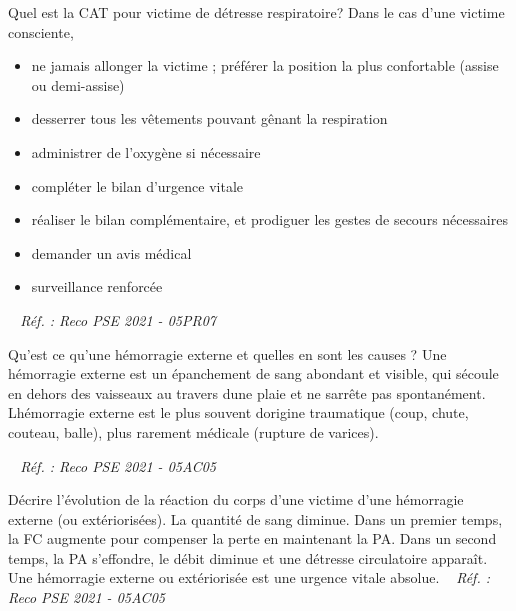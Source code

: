 \documentclass[grid,avery5371,landscape]{flashcards}
\makeatletter
\newcounter{nocarte}
\newcommand{\categ}[1]{%
  \def\@categ{#1}%
  \setcounter{nocarte}{0}%
}
\newcommand{\source}[1]{%
  \medskip
  \itshape%
   ~ \hfill Réf. : #1}
\makeatother
\begin{document}
\color[HTML]{003273}
\categ{PSE}
\begin{flashcard}[CAT]{
 Quel est la CAT pour victime de détresse respiratoire?   }
  Dans le cas d'une victime consciente, \begin{itemize} 
\item ne jamais allonger la victime ; préférer la position la plus confortable (assise ou demi-assise)
\item desserrer tous les vêtements pouvant gênant la respiration
\item administrer de l'oxygène si nécessaire 
\item compléter le bilan d'urgence vitale 
\item réaliser le bilan complémentaire, et prodiguer les gestes de secours nécessaires 
\item demander un avis médical 
\item surveillance renforcée \end{itemize}
  \source{Reco PSE 2021 - 05PR07}
\end{flashcard}


\color[HTML]{003273}
\categ{PSE}
\begin{flashcard}[bilan]{
 Qu'est ce qu'une hémorragie externe et quelles en sont les causes ?   }
  Une hémorragie externe est un épanchement de sang abondant et visible, qui sécoule en dehors des vaisseaux au travers dune plaie et ne sarrête pas spontanément. \\ 
Lhémorragie externe est le plus souvent dorigine traumatique (coup, chute, couteau, balle), plus rarement médicale (rupture de varices).

  \source{Reco PSE 2021 - 05AC05}
\end{flashcard}


\color[HTML]{003273}
\categ{PSE}
\begin{flashcard}[bilan]{
 Décrire l'évolution de la réaction du corps d'une victime d'une hémorragie externe (ou extériorisées).   }
  La quantité de sang diminue. Dans un premier temps, la FC augmente pour compenser la perte en maintenant la PA. Dans un second temps, la PA s'effondre, le débit diminue et une détresse circulatoire apparaît. \\
Une hémorragie externe ou extériorisée est une urgence vitale absolue.
  \source{Reco PSE 2021 - 05AC05}
\end{flashcard}
\end{document}
